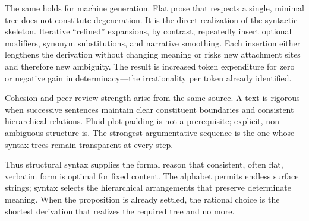 The same holds for machine generation. Flat prose that respects a single, minimal tree does not constitute degeneration. It is the direct realization of the syntactic skeleton. Iterative “refined” expansions, by contrast, repeatedly insert optional modifiers, synonym substitutions, and narrative smoothing. Each insertion either lengthens the derivation without changing meaning or risks new attachment sites and therefore new ambiguity. The result is increased token expenditure for zero or negative gain in determinacy—the irrationality per token already identified.

Cohesion and peer-review strength arise from the same source. A text is rigorous when successive sentences maintain clear constituent boundaries and consistent hierarchical relations. Fluid plot padding is not a prerequisite; explicit, non-ambiguous structure is. The strongest argumentative sequence is the one whose syntax trees remain transparent at every step.

Thus structural syntax supplies the formal reason that consistent, often flat, verbatim form is optimal for fixed content. The alphabet permits endless surface strings; syntax selects the hierarchical arrangements that preserve determinate meaning. When the proposition is already settled, the rational choice is the shortest derivation that realizes the required tree and no more.
